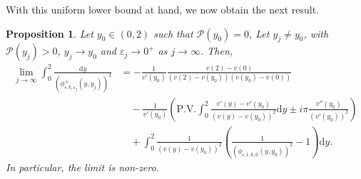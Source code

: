 \documentclass[11pt,reqno]{amsproc}
\newtheorem{proposition}{Proposition}[section]
\theoremstyle{definition}
\numberwithin{equation}{section}
\newcommand{\sr}{{\mathsf{r}}}
\renewcommand{\d}{\mathrm{d}}
\newcommand{\ep}{\varepsilon}
\renewcommand{\P}{{\mathcal{P}}}
\begin{document}
With this uniform lower bound at hand, we now obtain the next result.

\begin{proposition}\label{prop:limitWronkianFragile}
Let $y_0\in (0,2)$ such that $\P(y_0)=0$, Let $y_j\neq y_0$, with $\P(y_j)>0$, $y_j\rightarrow y_0$ and $\ep_j\rightarrow 0^+$ as $j\rightarrow \infty$. Then,
\begin{align*}
\lim_{j\rightarrow \infty} \int_0^2 \frac{\d y}{(\phi_{\sr,k,\ep_j}^\pm(y,y_j))^2} &= -\frac{1}{v'(y_0)}  \frac{v(2) - v(0)}{(v(2) - v(y_0))(v(y_0) - v(0))}  \\
&\quad -\frac{1}{v'(y_0)}\left( \text{P.V.} \int_0^2 \frac{v'(y) - v'(y_0)}{(v(y) - v(y_0))^2} \d y \pm i \pi \frac{v''(y_0)}{(v'(y_0))^2} \right) \\ 
&\quad + \int_0^2 \frac{1}{(v(y) - v(y_0))^2} \left( \frac{1}{(\phi_{\sr,1,k,0}(y,y_0))^2} -1 \right) \d y.
\end{align*}
In particular, the limit is non-zero.
\end{proposition}
\end{document}
